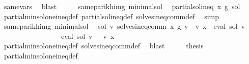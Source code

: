 \begin{isabellebody}
\ same{\isacharunderscore}{\kern0pt}vars\ \isamarkupfalse%
\ blast\isanewline
\ \ \isamarkupfalse%
\ \isamarkupfalse%
\ same{\isacharunderscore}{\kern0pt}parikh{\isacharunderscore}{\kern0pt}img\ minimal{\isacharunderscore}{\kern0pt}sol\ \isamarkupfalse%
\ {\isachardoublequoteopen}partial{\isacharunderscore}{\kern0pt}sol{\isacharunderscore}{\kern0pt}ineq\ x\ g\ sol{\isachardoublequoteclose}\isanewline
\ \ \ \ \isamarkupfalse%
\ partial{\isacharunderscore}{\kern0pt}min{\isacharunderscore}{\kern0pt}sol{\isacharunderscore}{\kern0pt}one{\isacharunderscore}{\kern0pt}ineq{\isacharunderscore}{\kern0pt}def\ partial{\isacharunderscore}{\kern0pt}sol{\isacharunderscore}{\kern0pt}ineq{\isacharunderscore}{\kern0pt}def\ solves{\isacharunderscore}{\kern0pt}ineq{\isacharunderscore}{\kern0pt}comm{\isacharunderscore}{\kern0pt}def\ \isamarkupfalse%
\ simp\isanewline
\ \ \isamarkupfalse%
\ \isamarkupfalse%
\ same{\isacharunderscore}{\kern0pt}parikh{\isacharunderscore}{\kern0pt}img\ minimal{\isacharunderscore}{\kern0pt}sol\ \isamarkupfalse%
\ {\isachardoublequoteopen}{\isasymforall}sol{\isacharprime}{\kern0pt}\ v{\isacharprime}{\kern0pt}{\isachardot}{\kern0pt}\ solves{\isacharunderscore}{\kern0pt}ineq{\isacharunderscore}{\kern0pt}comm\ x\ g\ v{\isacharprime}{\kern0pt}\ {\isasymand}\ v{\isacharprime}{\kern0pt}\ x\ {\isacharequal}{\kern0pt}\ eval\ sol{\isacharprime}{\kern0pt}\ v{\isacharprime}{\kern0pt}\isanewline
\ \ \ \ \ \ \ \ \ \ \ \ \ \ \ {\isasymlongrightarrow}\ {\isasymPsi}\ {\isacharparenleft}{\kern0pt}eval\ sol\ v{\isacharprime}{\kern0pt}{\isacharparenright}{\kern0pt}\ {\isasymsubseteq}\ {\isasymPsi}\ {\isacharparenleft}{\kern0pt}v{\isacharprime}{\kern0pt}\ x{\isacharparenright}{\kern0pt}{\isachardoublequoteclose}\isanewline
\ \ \ \ \isamarkupfalse%
\ partial{\isacharunderscore}{\kern0pt}min{\isacharunderscore}{\kern0pt}sol{\isacharunderscore}{\kern0pt}one{\isacharunderscore}{\kern0pt}ineq{\isacharunderscore}{\kern0pt}def\ solves{\isacharunderscore}{\kern0pt}ineq{\isacharunderscore}{\kern0pt}comm{\isacharunderscore}{\kern0pt}def\ \isamarkupfalse%
\ blast\isanewline
\ \ \isamarkupfalse%
\ \isamarkupfalse%
\ {\isacharquery}{\kern0pt}thesis\ \isamarkupfalse%
\ partial{\isacharunderscore}{\kern0pt}min{\isacharunderscore}{\kern0pt}sol{\isacharunderscore}{\kern0pt}one{\isacharunderscore}{\kern0pt}ineq{\isacharunderscore}{\kern0pt}def\ \isamarkupfalse%

\end{isabellebody}
